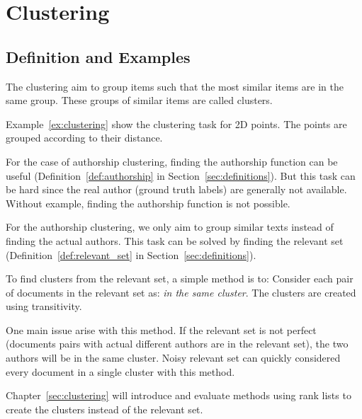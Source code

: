 \section{Clustering}

\subsection{Definition and Examples}

The clustering aim to group items such that the most similar items are in the same group.
These groups of similar items are called clusters.

Example~\ref{ex:clustering} show the clustering task for 2D points.
The points are grouped according to their distance.

For the case of authorship clustering, finding the authorship function can be useful (Definition~\ref{def:authorship} in Section~\ref{sec:definitions}).
But this task can be hard since the real author (ground truth labels) are generally not available.
Without example, finding the authorship function is not possible.

For the authorship clustering, we only aim to group similar texts instead of finding the actual authors.
This task can be solved by finding the relevant set (Definition~\ref{def:relevant_set} in Section~\ref{sec:definitions}).

To find clusters from the relevant set, a simple method is to:
Consider each pair of documents in the relevant set as: \textit{in the same cluster}.
The clusters are created using transitivity.

One main issue arise with this method.
If the relevant set is not perfect (documents pairs with actual different authors are in the relevant set), the two authors will be in the same cluster.
Noisy relevant set can quickly considered every document in a single cluster with this method.

Chapter~\ref{sec:clustering} will introduce and evaluate methods using rank lists to create the clusters instead of the relevant set.

